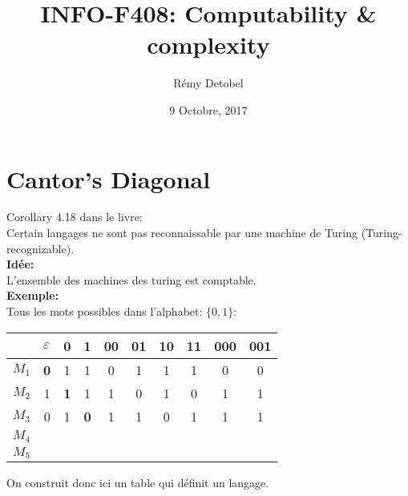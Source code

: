 \documentclass[a4paper,12pt]{article}
\title{INFO-F408: Computability \& complexity}
\date{9 Octobre, 2017}
\author{Rémy Detobel}
\begin{document}
\maketitle
\newpage

\section{Cantor's Diagonal}
  Corollary 4.18 dans le livre:\\
  Certain langages ne sont pas reconnaissable par une machine de Turing (Turing-recognizable).\\
  \textbf{Idée:}\\
  L'ensemble des machines des turing est comptable.\\
  
  \textbf{Exemple:}\\
  Tous les mots possibles dans l'alphabet: $\{0, 1\}$:\\
  
  \begin{table}[h]
    \centering
    \begin{tabular}{l|ccccccccc}
      & \multicolumn{1}{l}{$\varepsilon$} & \multicolumn{1}{l}{0} & \multicolumn{1}{l}{1} & \multicolumn{1}{l}{00} & \multicolumn{1}{l}{01} & \multicolumn{1}{l}{10} & \multicolumn{1}{l}{11} & \multicolumn{1}{l}{000} & \multicolumn{1}{l}{001} \\ \hline
      $M_1$ & \textbf{0}        & 1                     & 1                     & 0                      & 1                      & 1                      & 1                      & 0                       & 0  \\
      $M_2$ & 1                 & \textbf{1}            & 1                     & 1                      & 0                      & 1                      & 0                      & 1                       & 1  \\
      $M_3$ & 0                 & 1                     & \textbf{0}            & 1                      & 1                      & 0                      & 1                      & 1                       & 1  \\
      $M_4$ &                   &                       &                       &                        &                        &                        &                        &                         &    \\
      $M_5$ &                   &                       &                       &                        &                        &                        &                        &                         &
    \end{tabular}
  \end{table}
  On construit donc ici un table qui définit un langage.  
  
\end{document}
